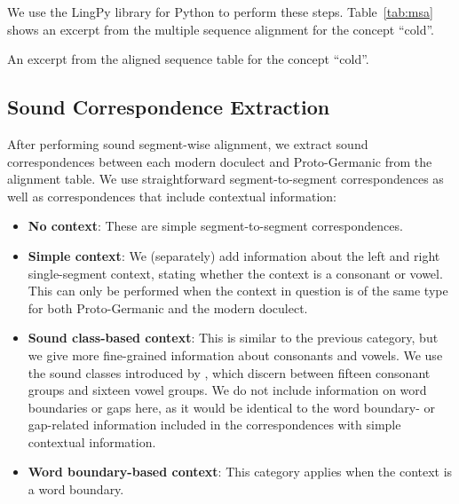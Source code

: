 \documentclass[a4paper]{article}
\begin{document}
We use the LingPy library for Python \citep{list2018lingpy} to perform these steps.
Table~\ref{tab:msa} shows an excerpt from the multiple sequence alignment for the concept ``cold''.

\begin{table}[h]
\begin{center}

\end{center}
\caption{An excerpt from the aligned sequence table for the concept ``cold''.}
\label{tab:msa}
\end{table}

\subsection{Sound Correspondence Extraction}
\label{subsec:corres}

After performing sound segment-wise alignment,
we extract sound correspondences between each
modern doculect and Proto-Germanic from the alignment table.
We use straightforward segment-to-segment correspondences
as well as correspondences that include contextual information:

\begin{itemize}
\item
\textbf{No context}:
These are simple segment-to-segment correspondences.

\item
\textbf{Simple context}:
We (separately) add information about the
left and right single-segment context,
stating whether the context is a consonant or vowel. 
This can only be performed when the context in question is of
the same type for both Proto-Germanic and the modern doculect.

\item
\textbf{Sound class-based context}:
This is similar to the previous category,
but we give more fine-grained information about consonants and vowels.
We use the sound classes introduced by \citet{list2012sca},
which discern between fifteen consonant groups and sixteen vowel groups.
We do not include information on word boundaries or gaps here,
as it would be identical to the word boundary- or gap-related information
included in the correspondences with simple contextual information.

\item
\textbf{Word boundary-based context}:
This category applies when the context is a word boundary.

\end{itemize}
\end{document}
